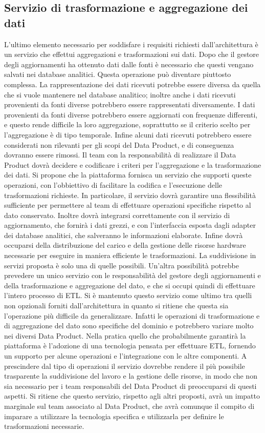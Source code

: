 \documentclass[a4paper,12pt]{report}
\begin{document}
\subsection{Servizio di trasformazione e aggregazione dei dati}
L'ultimo elemento necessario per soddisfare i requisiti richiesti dall'architettura è un servizio che effettui aggregazioni e trasformazioni sui dati.
Dopo che il gestore degli aggiornamenti ha ottenuto dati dalle fonti è necessario che questi vengano salvati nei database analitici.
Questa operazione può diventare piuttosto complessa.
La rappresentazione dei dati ricevuti potrebbe essere diversa da quella che si vuole mantenere nel database analitico; inoltre anche i dati ricevuti provenienti da fonti diverse potrebbero essere rappresentati diversamente.
I dati provenienti da fonti diverse potrebbero essere aggiornati con frequenze differenti, e questo rende difficile la loro aggregazione, soprattutto se il criterio scelto per l'aggregazione è di tipo temporale.
Infine alcuni dati ricevuti potrebbero essere considerati non rilevanti per gli scopi del Data Product, e di conseguenza dovranno essere rimossi.
Il team con la responsabilità di realizzare il Data Product dovrà decidere e codificare i criteri per l'aggregazione e la trasformazione dei dati.
Si propone che la piattaforma fornisca un servizio che supporti queste operazioni, con l'obbiettivo di facilitare la codifica e l'esecuzione delle trasformazioni richieste.
In particolare, il servizio dovrà garantire una flessibilità sufficiente per permettere al team di effettuare operazioni specifiche rispetto al dato conservato.
Inoltre dovrà integrarsi correttamente con il servizio di aggiornamento, che fornirà i dati grezzi, e con l'interfaccia esposta dagli adapter dei database analitici, che salveranno le informazioni elaborate.
Infine dovrà occuparsi della distribuzione del carico e della gestione delle risorse hardware necessarie per eseguire in maniera efficiente le trasformazioni. 
La suddivisione in servizi proposta è solo una di quelle possibili. 
Un'altra possibilità potrebbe prevedere un unico servizio con le responsabilità del gestore degli aggiornamenti e della  trasformazione e aggregazione del dato, e che si occupi quindi di effettuare l'intero processo di ETL.
Si è mantenuto questo servizio come ultimo tra quelli non opzionali forniti dall'architettura in quanto si ritiene che questa sia l'operazione più difficile da generalizzare.
Infatti le operazioni di trasformazione e di aggregazione del dato sono specifiche del dominio e potrebbero variare molto nei diversi Data Product.
Nella pratica quello che probabilmente garantirà la piattaforma è l'adozione di una tecnologia pensata per effettuare ETL, fornendo un supporto per alcune operazioni e l'integrazione con le altre componenti.
A prescindere dal tipo di operazioni il servizio dovrebbe rendere il più possibile trasparente la suddivisione del lavoro e la gestione delle risorse, in modo che non sia necessario per i team responsabili del Data Product di preoccuparsi di questi aspetti.
Si ritiene che questo servizio, rispetto agli altri proposti, avrà un impatto marginale sul team associato al Data Product, che avrà comunque il compito di imparare a utilizzare la tecnologia specifica e utilizzarla per definire le trasformazioni necessarie.
\end{document}
